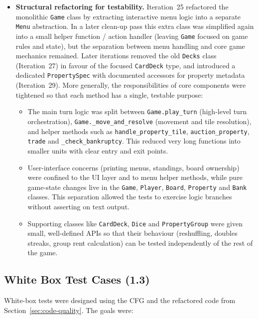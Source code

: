 \documentclass[11pt]{article}
\begin{document}
\begin{itemize}
  \item \textbf{Structural refactoring for testability.}  Iteration~25 refactored the monolithic \texttt{Game} class by extracting interactive menu logic into a separate \texttt{Menu} abstraction.  In a later clean-up pass this extra class was simplified again into a small helper function / action handler (leaving \texttt{Game} focused on game rules and state), but the separation between menu handling and core game mechanics remained.  Later iterations removed the old \texttt{Decks} class (Iteration~27) in favour of the focused \texttt{CardDeck} type, and introduced a dedicated \texttt{PropertySpec} with documented accessors for property metadata (Iteration~29).  More generally, the responsibilities of core components were tightened so that each method has a single, testable purpose:
  \begin{itemize}
    \item The main turn logic was split between \texttt{Game.play\_turn} (high-level turn orchestration), \texttt{Game.\_move\_and\_resolve} (movement and tile resolution), and helper methods such as \texttt{handle\_property\_tile}, \texttt{auction\_property}, \texttt{trade} and \texttt{\_check\_bankruptcy}.  This reduced very long functions into smaller units with clear entry and exit points.
    \item User-interface concerns (printing menus, standings, board ownership) were confined to the UI layer and to menu helper methods, while pure game-state changes live in the \texttt{Game}, \texttt{Player}, \texttt{Board}, \texttt{Property} and \texttt{Bank} classes.  This separation allowed the tests to exercise logic branches without asserting on text output.
    \item Supporting classes like \texttt{CardDeck}, \texttt{Dice} and \texttt{PropertyGroup} were given small, well-defined APIs so that their behaviour (reshuffling, doubles streaks, group rent calculation) can be tested independently of the rest of the game.
  
\end{itemize}

\end{itemize}

\subsection{White Box Test Cases (1.3)}
\label{sec:white-box-tests}

White-box tests were designed using the CFG and the refactored code from Section~\ref{sec:code-quality}.  The goals were:
\end{document}
